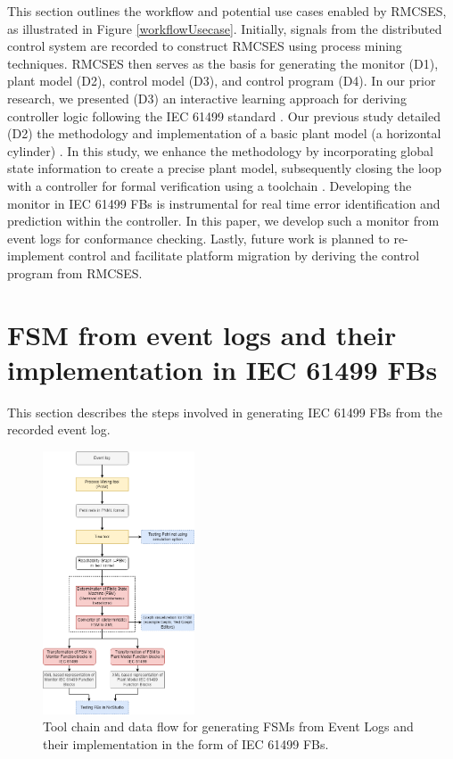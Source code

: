 \begin{bibunit}
This section outlines the workflow and potential use cases enabled by RMCSES, as illustrated in Figure \ref{workflowUsecase}. Initially, signals from the distributed control system are recorded to construct RMCSES using process mining techniques. RMCSES then serves as the basis for generating the monitor (D1), plant model (D2), control model (D3), and control program (D4). In our prior research, we presented (D3) an interactive learning approach for deriving controller logic following the IEC 61499 standard \cite{xavier2022interactive}. Our previous study detailed (D2) the methodology and implementation of a basic plant model (a horizontal cylinder) \cite{xavier2022plant}. In this study, we enhance the methodology by incorporating global state information to create a precise plant model, subsequently closing the loop with a controller for formal verification using a toolchain \cite{xavier2021cyber}. Developing the monitor in IEC 61499 FBs is instrumental for real time error identification and prediction within the controller. In this paper, we develop such a monitor from event logs for conformance checking. Lastly, future work is planned to re-implement control and facilitate platform migration by deriving the control program from RMCSES.



\section{FSM from event logs and their implementation in IEC 61499 FBs}
\label{FSMfromEL}

This section describes the steps involved  in generating  IEC 61499 FBs from the recorded event log.

\begin{figure}[!t]
	\centering
	\includegraphics[width=0.4\textwidth]{MX_Papers/Paper7/images/Methodology.png}
	\caption{Tool chain and data flow for generating FSMs from Event Logs and their implementation in the form of IEC 61499 FBs.}
	\label{monitorFlowchart}
\end{figure}
    

\end{bibunit}
